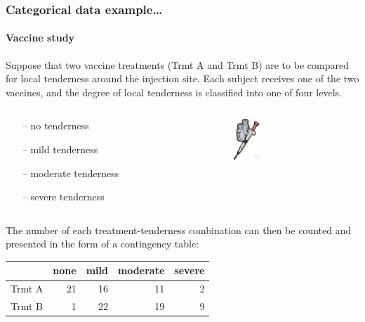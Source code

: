 \documentclass{beamer}\usepackage[]{graphicx}\usepackage[]{xcolor}
\begin{document}
\begin{frame}
\frametitle{Categorical data example\ldots}
\framesubtitle{Vaccine study}

Suppose that two vaccine treatments (Trmt A and Trmt B) are to be compared for local tenderness around the injection site. Each subject receives one of the two vaccines, and the degree of local tenderness is classified into one of four levels.

\begin{columns}
\begin{column}{0.6\textwidth}
\begin{itemize}
\setlength{\itemsep}{0mm}
\small
\item[--] no tenderness
\item[--] mild tenderness
\item[--] moderate tenderness
\item[--] severe tenderness
\end{itemize}
\end{column}

\begin{column}{0.4\textwidth}
\includegraphics[width=0.4in]{Figures/Needle.jpg}
\end{column}
\end{columns}

\bigskip

The number of each treatment-tenderness combination can then be counted and presented in the form of a contingency table:

\medskip

\begin{tabular}{c|rrrr}
          & none & mild & moderate & severe \\ \hline
Trmt A    &  21  &  16  &   11     &   2    \\
Trmt B    &   1  &  22  &   19     &   9    \\ \hline
\end{tabular}
\end{frame}
\end{document}
